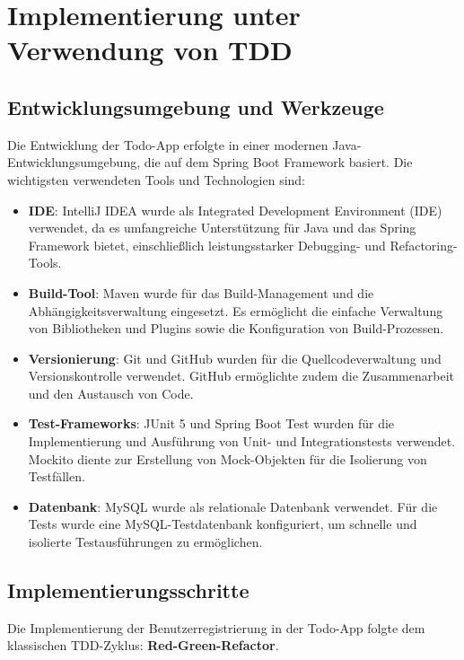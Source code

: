 \chapter{Implementierung unter Verwendung von TDD}

\section{Entwicklungsumgebung und Werkzeuge}

Die Entwicklung der Todo-App erfolgte in einer modernen Java-Entwicklungsumgebung, die auf dem Spring Boot Framework basiert. Die wichtigsten verwendeten Tools und Technologien sind:

\begin{itemize}
	\item \textbf{IDE}: IntelliJ IDEA wurde als Integrated Development Environment (IDE) verwendet, da es umfangreiche Unterstützung für Java und das Spring Framework bietet, einschließlich leistungsstarker Debugging- und Refactoring-Tools.
	\item \textbf{Build-Tool}: Maven wurde für das Build-Management und die Abhängigkeitsverwaltung eingesetzt. Es ermöglicht die einfache Verwaltung von Bibliotheken und Plugins sowie die Konfiguration von Build-Prozessen.
	\item \textbf{Versionierung}: Git und GitHub wurden für die Quellcodeverwaltung und Versionskontrolle verwendet. GitHub ermöglichte zudem die Zusammenarbeit und den Austausch von Code.
	\item \textbf{Test-Frameworks}: JUnit 5 und Spring Boot Test wurden für die Implementierung und Ausführung von Unit- und Integrationstests verwendet. Mockito diente zur Erstellung von Mock-Objekten für die Isolierung von Testfällen.
	\item \textbf{Datenbank}: MySQL wurde als relationale Datenbank verwendet. Für die Tests wurde eine MySQL-Testdatenbank konfiguriert, um schnelle und isolierte Testausführungen zu ermöglichen.
\end{itemize}

\section{Implementierungsschritte}

Die Implementierung der Benutzerregistrierung in der Todo-App folgte dem klassischen TDD-Zyklus: \textbf{Red-Green-Refactor}.

